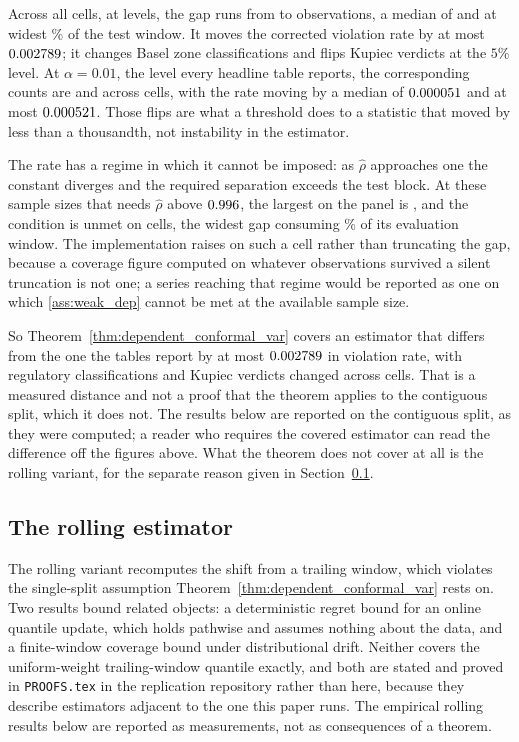 Across all \nGapAllCells{} cells, at \nGapAllLevels{} levels, the gap runs from
\nGapAllGapLo{} to \nGapAllGapHi{} observations, a median of
\nGapAllGapMed{} and at widest \nGapWidestPct\% of the test window. It moves
the corrected violation rate by at most $0.002789$; it changes
\nGapAllZoneChanges{} Basel zone classifications and flips
\nGapAllKupFlips{} Kupiec verdicts at the $5\%$ level. At $\alpha = 0.01$, the
level every headline table reports, the corresponding counts are
\nGapPanelZoneChanges{} and \nGapPanelKupFlips{} across \nGapPanelCells{}
cells, with the rate moving by a median of $0.000051$ and at most
$0.000521$. Those flips are what a threshold does to a statistic that
moved by less than a thousandth, not instability in the estimator.

The rate has a regime in which it cannot be imposed: as $\hat\rho$ approaches
one the constant diverges and the required separation exceeds the test block. At
these sample sizes that needs $\hat\rho$ above $0.996$, the largest on
the panel is \nGapMaxRho, and the condition is unmet on \nGapCellsUnmet{} cells,
the widest gap consuming \nGapWidestPct\% of its evaluation window. The
implementation raises on such a cell rather than truncating the gap, because a
coverage figure computed on whatever observations survived a silent truncation is
not one; a series reaching that regime would be reported as one on which
\ref{ass:weak_dep} cannot be met at the available sample size.

So Theorem~\ref{thm:dependent_conformal_var} covers an estimator that differs
from the one the tables report by at most $0.002789$ in violation rate,
with \nGapAllZoneChanges{} regulatory classifications and
\nGapAllKupFlips{} Kupiec verdicts changed across \nGapAllCells{} cells. That
is a measured distance and not a proof that the theorem applies to the
contiguous split, which it does not. The results below are reported on the
contiguous split, as they were computed; a reader who requires the covered
estimator can read the difference off the figures above. What the theorem does
not cover at all is the rolling variant, for the separate reason given in
Section~\ref{sec:theory_rolling}.

\subsection{The rolling estimator}
\label{sec:theory_rolling}

The rolling variant recomputes the shift from a trailing window, which violates
the single-split assumption Theorem~\ref{thm:dependent_conformal_var} rests on.
Two results bound related objects: a deterministic regret bound for an online
quantile update, which holds pathwise and assumes nothing about the data, and a
finite-window coverage bound under distributional drift. Neither covers the
uniform-weight trailing-window quantile exactly, and both are stated and proved
in \texttt{PROOFS.tex} in the replication repository rather than here, because
they describe estimators adjacent to the one this paper runs. The empirical
rolling results below are reported as measurements, not as consequences of a
theorem.
